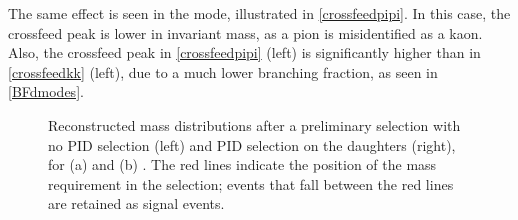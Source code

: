The same effect is seen in the \pipi mode, illustrated in \fig\ref{crossfeedpipi}. In this case, the crossfeed peak is lower in invariant mass, as a pion is misidentified as a kaon. Also, the crossfeed peak in \fig\ref{crossfeedpipi} (left) is significantly higher than in \fig\ref{crossfeedkk} (left), due to a much lower \decay{\Dz}{\pip\pim} branching fraction, as seen in \tab\ref{BFdmodes}.

\begin{figure}
\hfill
{}
\caption{Reconstructed \Dz mass distributions after a preliminary selection with no PID selection (left) and PID selection on the \Dz daughters (right), for (a) \kk and (b) \pipi. The red lines indicate the position of the \Dz mass requirement in the selection; events that fall between the red lines are retained as signal events.}
\label{fig:crossfeed}
\end{figure}

